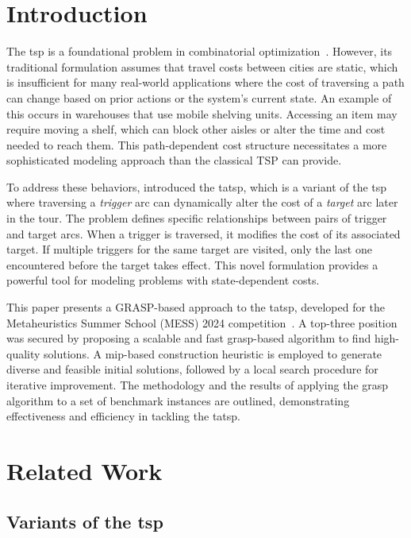 \documentclass[twocolumn, switch]{article} %
\begin{document}
\section{Introduction}
The \gls{tsp} is a foundational problem in combinatorial optimization~\cite{Applegate2011}. 
However, its traditional formulation assumes that travel costs between cities are static, which is insufficient for many real-world applications where the cost of traversing a path can change based on prior actions or the system's current state.
An example of this occurs in warehouses that use mobile shelving units. Accessing an item may require moving a shelf, which can block other aisles or alter the time and cost needed to reach them. This path-dependent cost structure necessitates a more sophisticated modeling approach than the classical TSP can provide.

To address these behaviors, \citet{Cerrone} introduced the \gls{tatsp}, which is a variant of the \gls{tsp} where traversing a \textit{trigger} arc can dynamically alter the cost of a \textit{target} arc later in the tour. 
The problem defines specific relationships between pairs of trigger and target arcs. 
When a trigger is traversed, it modifies the cost of its associated target. 
If multiple triggers for the same target are visited, only the last one encountered before the target takes effect. 
This novel formulation provides a powerful tool for modeling problems with state-dependent costs.

This paper presents a GRASP-based approach to the \gls{tatsp}, developed for the Metaheuristics Summer School (MESS) 2024 competition~\cite{mess2024}. 
A top-three position was secured by proposing a scalable and fast \gls{grasp}-based algorithm to find high-quality solutions. 
A \gls{mip}-based construction heuristic is employed to generate diverse and feasible initial solutions, followed by a local search procedure for iterative improvement.
The methodology and the results of applying the \gls{grasp} algorithm to a set of benchmark instances are outlined, demonstrating effectiveness and efficiency in tackling the \gls{tatsp}.

\section{Related Work}
\label{sec:related_work}

\subsection{Variants of the \gls{tsp}}
\end{document}
